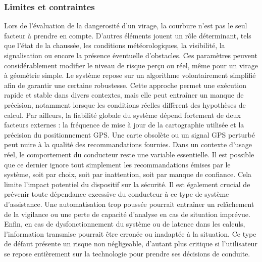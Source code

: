 \subsubsection{Limites et contraintes}
Lors de l’évaluation de la dangerosité d’un virage, la courbure n’est pas le seul facteur à prendre en compte. D’autres éléments jouent un rôle déterminant, tels que l’état de la chaussée, les conditions météorologiques, la visibilité, la signalisation ou encore la présence éventuelle d’obstacles. Ces paramètres peuvent considérablement modifier le niveau de risque perçu ou réel, même pour un virage à géométrie simple.
Le système repose sur un algorithme volontairement simplifié afin de garantir une certaine robustesse. Cette approche permet une exécution rapide et stable dans divers contextes, mais elle peut entraîner un manque de précision, notamment lorsque les conditions réelles diffèrent des hypothèses de calcul. Par ailleurs, la fiabilité globale du système dépend fortement de deux facteurs externes : la fréquence de mise à jour de la cartographie utilisée et la précision du positionnement GPS. Une carte obsolète ou un signal GPS perturbé peut nuire à la qualité des recommandations fournies.
Dans un contexte d’usage réel, le comportement du conducteur reste une variable essentielle. Il est possible que ce dernier ignore tout simplement les recommandations émises par le système, soit par choix, soit par inattention, soit par manque de confiance. Cela limite l’impact potentiel du dispositif sur la sécurité.
Il est également crucial de prévenir toute dépendance excessive du conducteur à ce type de système d’assistance. Une automatisation trop poussée pourrait entraîner un relâchement de la vigilance ou une perte de capacité d’analyse en cas de situation imprévue. Enfin, en cas de dysfonctionnement du système ou de latence dans les calculs, l’information transmise pourrait être erronée ou inadaptée à la situation. Ce type de défaut présente un risque non négligeable, d’autant plus critique si l’utilisateur se repose entièrement sur la technologie pour prendre ses décisions de conduite.

